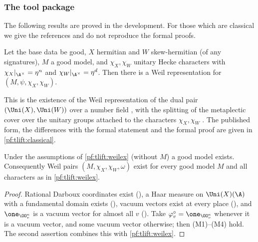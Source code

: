 \subsubsection*{The tool package}
The following results are proved in the development. For those which are classical we give the
references and do not reproduce the formal proofs.

\begin{theorem}\label{pf:tlift:weilex}
Let the base data be good, $X$ hermitian and $W$ skew-hermitian (of any signatures), $M$ a good model,
and $\chi_X,\chi_W$ unitary Hecke characters with $\chi_X|_{\A^\times}=\eta^n$ and $\chi_W|_{\A^\times}=\eta^d$. Then
there is a Weil representation for $(M,\psi,\chi_X,\chi_W)$.
\end{theorem}

This is the existence of the Weil representation of the dual pair $(\Uni(X),\Uni(W))$ over a number field
\cite{Weil1964}, with the splitting of the metaplectic cover over the unitary groups attached to the
characters $\chi_X,\chi_W$ \cite{Kudla1994,HarrisKudlaSweet1996}. The published form, the differences with the
formal statement and the formal proof are given in \cref{pf:tlift:classical}.

\begin{proposition}\label{pf:tlift:pairex}
Under the assumptions of \cref{pf:tlift:weilex} (without $M$) a good model exists. Consequently Weil pairs
$(M,\chi_X,\chi_W,\omega)$ exist for every good model $M$ and all characters as in \cref{pf:tlift:weilex}.
\end{proposition}

\begin{proof}
Rational Darboux coordinates exist (), a Haar
measure on $\Uni(X)(\A)$ with a fundamental domain exists (),
vacuum vectors exist at every place (), and
$\one_{\OO_v^\kappa}$ is a vacuum vector for almost all $v$ ().
Take $\tliftvac_v=\one_{\OO_v^\kappa}$ whenever it is a vacuum vector, and some vacuum vector otherwise; then
(M1)--(M4) hold. The second assertion combines this with \cref{pf:tlift:weilex}.
\end{proof}

